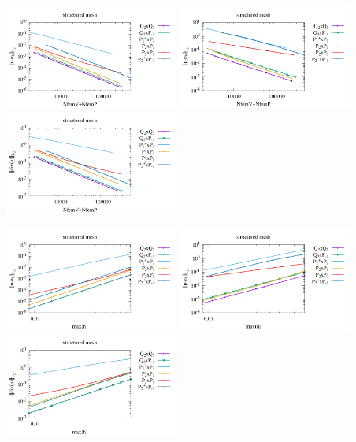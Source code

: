 \begin{center}
\includegraphics[width=5.7cm]{python_codes/fieldstone_120/paperresults/tesk12_structured_errorsV2.pdf}
\includegraphics[width=5.7cm]{python_codes/fieldstone_120/paperresults/tesk12_structured_errorsP2.pdf}
\includegraphics[width=5.7cm]{python_codes/fieldstone_120/paperresults/tesk12_structured_errors_divv2.pdf}\\
\end{center}

\begin{center}
\includegraphics[width=5.7cm]{python_codes/fieldstone_120/paperresults/tesk12_structured_errorsV3.pdf}
\includegraphics[width=5.7cm]{python_codes/fieldstone_120/paperresults/tesk12_structured_errorsP3.pdf}
\includegraphics[width=5.7cm]{python_codes/fieldstone_120/paperresults/tesk12_structured_errors_divv3.pdf}
\end{center}

